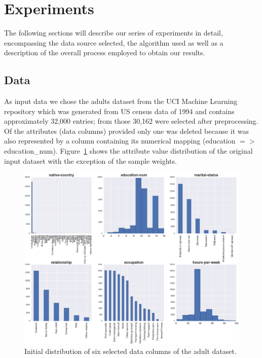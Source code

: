 \documentclass{llncs}
\begin{document}
\section{Experiments}
\label{sect:experiments}

The following sections will describe our series of experiments in detail, encompassing the data source selected, the algorithm used as well as a description of the overall process employed to obtain our results.


\subsection{Data} 
\label{ssect:data}

As input data we chose the adults dataset from the UCI Machine Learning repository which was generated from US census data of 1994 and contains approximately 32,000 entries; from those 30,162 were selected after preprocessing. Of the attributes (data columns) provided only one was deleted because it was also represented by a column containing its numerical mapping (education $=>$ education\_num). Figure~\ref{fig:adult_original_distribution} shows the attribute value distribution of the original input dataset with the exception of the sample weights.


\begin{figure}[!t]
	\begin{center}
    \hspace*{-0.8cm}
		\includegraphics[width=1.1\textwidth]{figures/experiment/dist_initial_small}
		\caption{Initial distribution of six selected data columns of the adult dataset.}
		\label{fig:adult_original_distribution}
	\end{center}
\end{figure}
\end{document}
